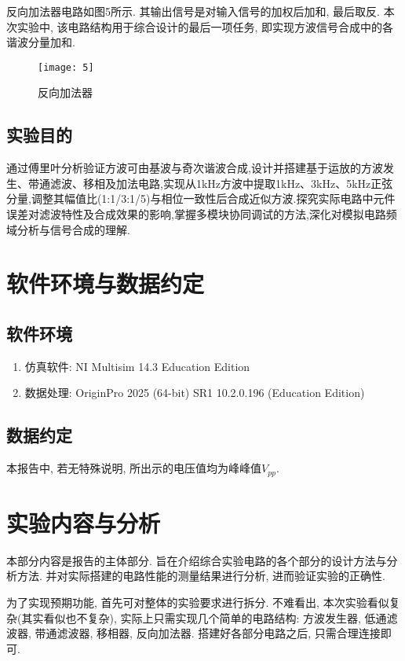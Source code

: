 \documentclass[UTF2]{ctexart}
\begin{document}
	反向加法器电路如图5所示. 其输出信号是对输入信号的加权后加和, 最后取反. 本次实验中, 该电路结构用于综合设计的最后一项任务, 即实现方波信号合成中的各谐波分量加和.
	
	\begin{figure}[h]
		\centering
		\texttt{[image: 5]}
		\caption{反向加法器}
	\end{figure}
	
	\subsection{实验目的}
	
	通过傅里叶分析验证方波可由基波与奇次谐波合成,设计并搭建基于运放的方波发生、带通滤波、移相及加法电路,实现从1kHz方波中提取1kHz、3kHz、5kHz正弦分量,调整其幅值比(1:1/3:1/5)与相位一致性后合成近似方波.探究实际电路中元件误差对滤波特性及合成效果的影响,掌握多模块协同调试的方法,深化对模拟电路频域分析与信号合成的理解.
	
	\section{软件环境与数据约定}
	
	\subsection{软件环境}
	
	\begin{enumerate}
		\item 仿真软件: NI Multisim 14.3 Education Edition 
		\item 数据处理: OriginPro 2025 (64-bit) SR1 10.2.0.196 (Education Edition) 
	\end{enumerate}
	
	\subsection{数据约定}
	本报告中, 若无特殊说明, 所出示的电压值均为峰峰值$V_{pp}$.
	
	\section{实验内容与分析}
	
	本部分内容是报告的主体部分. 旨在介绍综合实验电路的各个部分的设计方法与分析方法. 并对实际搭建的电路性能的测量结果进行分析, 进而验证实验的正确性.
	
	为了实现预期功能, 首先可对整体的实验要求进行拆分. 不难看出, 本次实验看似复杂(其实看似也不复杂), 实际上只需实现几个简单的电路结构: 方波发生器, 低通滤波器, 带通滤波器, 移相器, 反向加法器. 搭建好各部分电路之后, 只需合理连接即可.
	
\end{document}
